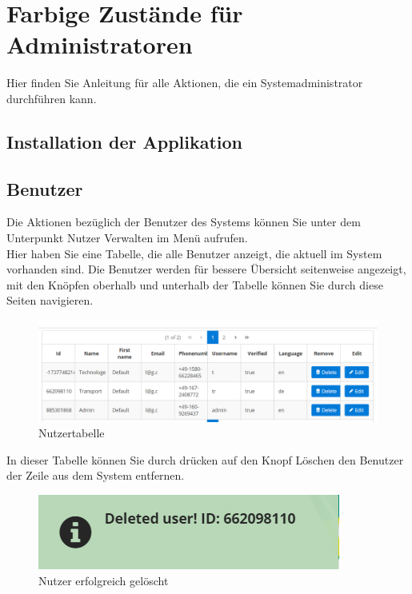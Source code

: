 \documentclass[enabledeprecatedfontcommands,fontsize=12pt,paper=a4,twoside]{scrartcl}
\begin{document}
\section{Farbige Zustände für Administratoren}
Hier finden Sie Anleitung für alle Aktionen, die ein Systemadministrator durchführen kann. 
\subsection{Installation der Applikation}
\subsection{Benutzer}
Die Aktionen bezüglich der Benutzer des Systems können Sie unter dem Unterpunkt Nutzer Verwalten im Menü aufrufen. \\

Hier haben Sie eine Tabelle, die alle Benutzer anzeigt, die aktuell im System vorhanden sind. Die Benutzer werden für bessere Übersicht seitenweise angezeigt, mit den Knöpfen oberhalb und unterhalb der Tabelle können Sie durch diese Seiten navigieren.\\

\begin{figure}[h!]
\begin{center}
 \includegraphics[width=\textwidth]{screenshots/admin/nutzertabelle.png}
  \caption{Nutzertabelle}
  \label{fig:boat1}
\end{center}
\end{figure}

 In dieser Tabelle können Sie durch drücken auf den Knopf Löschen den Benutzer der Zeile aus dem System entfernen.  \\
\begin{figure}[h!]
\begin{center}
 \includegraphics[width=\textwidth]{screenshots/admin/nutzerloeschen.png}
  \caption{Nutzer erfolgreich gelöscht}
  \label{fig:boat2}
\end{center}
\end{figure}
\end{document}

